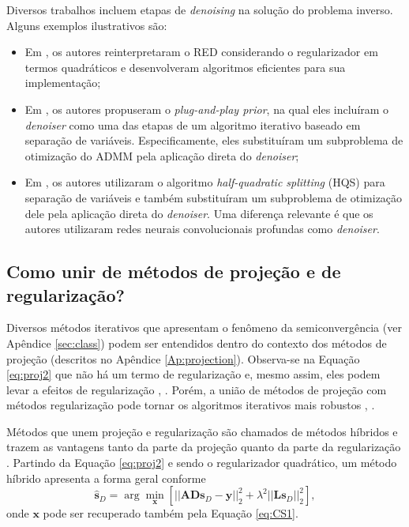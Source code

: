 Diversos trabalhos incluem etapas de \textit{denoising} na solução do problema inverso. Alguns exemplos ilustrativos são:
\begin{itemize}
\item Em \cite{Reehorst2019}, os autores reinterpretaram o RED considerando o regularizador em termos quadráticos e desenvolveram algoritmos eficientes para sua implementação;
\item Em \cite{VenkaPlugplay2013}, os autores propuseram o \textit{plug-and-play prior}, na qual eles incluíram o \textit{denoiser} como uma das etapas de um algoritmo iterativo baseado em separação de variáveis. Especificamente, eles substituíram um subproblema de otimização do ADMM pela aplicação direta do \textit{denoiser}; 
\item Em \cite{zhang2021plugandplay}, os autores utilizaram o algoritmo \textit{half-quadratic splitting} (HQS)  para separação de variáveis e também substituíram um subproblema de otimização dele pela aplicação direta do \textit{denoiser}. Uma diferença relevante é que os autores utilizaram redes neurais convolucionais profundas como \textit{denoiser}.
\end{itemize}


\subsection{Como unir de métodos de projeção e de regularização?}

Diversos métodos iterativos que apresentam o fenômeno da semiconvergência (ver Apêndice \ref{sec:class}) podem ser entendidos dentro do contexto dos métodos de projeção (descritos no Apêndice \ref{Ap:projection}). Observa-se na Equação  \eqref{eq:proj2} que não há um termo de regularização e, mesmo assim, eles podem levar a efeitos de regularização \cite{Santos1996}, \cite[pág. 117]{hansen2010discrete}. Porém, a união de métodos de projeção com métodos regularização pode tornar os algoritmos iterativos mais robustos \cite[págs. 126, 221]{engl1996regularization}, \cite[págs. 127, 131]{hansen2010discrete}. 

Métodos que unem projeção e regularização são chamados de métodos híbridos e trazem as vantagens tanto da parte da projeção quanto da parte da regularização \cite[pág. 129]{hansen2010discrete}. Partindo da Equação \eqref{eq:proj2} e sendo o regularizador quadrático, um método híbrido \cite[pág. 127]{hansen2010discrete} apresenta a forma geral conforme 
\begin{equation}
\bm{\hat{s}}_D = \arg\min\limits_{\mathbf{x}} \left[ \vert \vert \mathbf{A} \mathbf{D} \mathbf{s}_D - \mathbf{y} \vert \vert^2_2 + \lambda^2 \vert \vert \mathbf{L}\mathbf{s}_D \vert \vert_2^2 \right],
\label{eq:norma2proj}
\end{equation}
onde $\mathbf{x}$ pode ser recuperado também pela Equação \eqref{eq:CS1}. 

